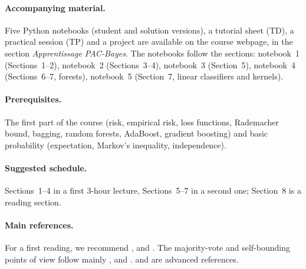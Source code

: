\documentclass[11pt,a4paper]{article}
\numberwithin{equation}{section}
\begin{document}
\paragraph{Accompanying material.} Five Python notebooks (student and solution
versions), a tutorial sheet (TD), a practical session (TP) and a project are
available on the course webpage, in the section \emph{Apprentissage PAC-Bayes}.
The notebooks follow the sections: notebook~1 (Sections~1--2), notebook~2
(Sections~3--4), notebook~3 (Section~5), notebook~4 (Sections~6--7, forests),
notebook~5 (Section~7, linear classifiers and kernels).

\paragraph{Prerequisites.} The first part of the course (risk, empirical risk,
loss functions, Rademacher bound, bagging, random forests, AdaBoost, gradient
boosting) and basic probability (expectation, Markov's inequality, independence).

\paragraph{Suggested schedule.} Sections~1--4 in a first 3-hour lecture,
Sections~5--7 in a second one; Section~8 is a reading section.

\paragraph{Main references.} For a first reading, we recommend
\citet{alquier2024user}, \citet{guedj2019primer} and \citet{langford2005tutorial}.
The majority-vote and self-bounding points of view follow mainly
\citet{germain2015risk}, \citet{masegosa2020second} and \citet{viallard2021self}.
\citet{catoni2007pac} and \citet{hellstrom2025generalization} are advanced references.

\end{document}
